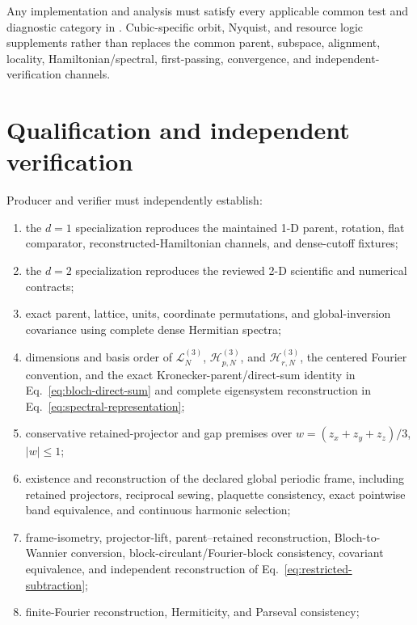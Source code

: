 \documentclass[11pt]{article}
\begin{document}
Any implementation and analysis must satisfy every applicable common test and
diagnostic category in
.
Cubic-specific orbit, Nyquist, and resource logic supplements rather than replaces the
common parent, subspace, alignment, locality, Hamiltonian/spectral, first-passing,
convergence, and independent-verification channels.

\section{Qualification and independent verification}

Producer and verifier must independently establish:

\begin{enumerate}[label=\arabic*.]
 \item the $d=1$ specialization reproduces the maintained 1-D parent, rotation, flat
       comparator, reconstructed-Hamiltonian channels, and dense-cutoff fixtures;
 \item the $d=2$ specialization reproduces the reviewed 2-D scientific and numerical
       contracts;
 \item exact parent, lattice, units, coordinate permutations, and global-inversion
       covariance using complete dense Hermitian spectra;
 \item dimensions and basis order of $\mathcal L_N^{(3)}$, $\mathcal H_{p,N}^{(3)}$,
       and $\mathcal H_{r,N}^{(3)}$, the centered Fourier convention, and the exact
       Kronecker-parent/direct-sum identity in Eq.~\eqref{eq:bloch-direct-sum} and
       complete eigensystem reconstruction in Eq.~\eqref{eq:spectral-representation};
 \item conservative retained-projector and gap premises over
       $w=(z_x+z_y+z_z)/3$, $|w|\le1$;
 \item existence and reconstruction of the declared global periodic frame, including
       retained projectors, reciprocal sewing, plaquette consistency, exact pointwise
       band equivalence, and continuous harmonic selection;
 \item frame-isometry, projector-lift, parent--retained reconstruction, Bloch-to-Wannier
       conversion, block-circulant/Fourier-block consistency, covariant equivalence, and
       independent reconstruction of Eq.~\eqref{eq:restricted-subtraction};
 \item finite-Fourier reconstruction, Hermiticity, and Parseval consistency;

\end{enumerate}
\end{document}
